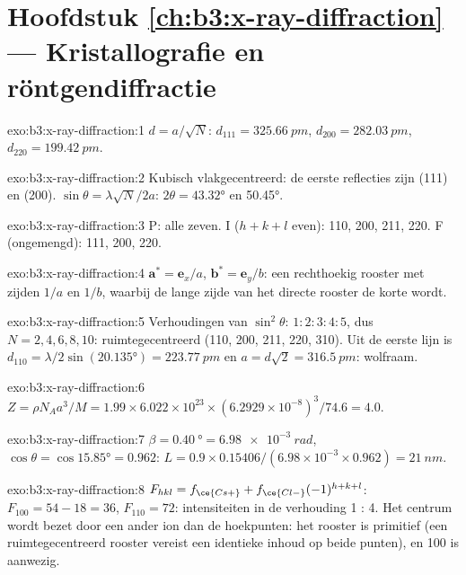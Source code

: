\section*{Hoofdstuk \ref{ch:b3:x-ray-diffraction} --- Kristallografie en röntgendiffractie}

\begin{solution}{exo:b3:x-ray-diffraction:1}
$d = a/\sqrt N$: $d_{111} = \qty{325.66}{pm}$, $d_{200} = \qty{282.03}{pm}$, $d_{220} =
\qty{199.42}{pm}$.
\end{solution}

\begin{solution}{exo:b3:x-ray-diffraction:2}
Kubisch vlakgecentreerd: de eerste reflecties zijn (111) en (200). $\sin\theta = \lambda\sqrt N/2a$: $2\theta =
\ang{43.32}$ en \ang{50.45}.
\end{solution}

\begin{solution}{exo:b3:x-ray-diffraction:3}
P: alle zeven. I ($h + k + l$ even): 110, 200, 211, 220. F (ongemengd): 111, 200, 220.
\end{solution}

\begin{solution}{exo:b3:x-ray-diffraction:4}
$\mathbf a^* = \mathbf e_x/a$, $\mathbf b^* = \mathbf e_y/b$: een rechthoekig
rooster met zijden $1/a$
en $1/b$, waarbij de lange zijde van het directe rooster de korte wordt.
\end{solution}

\begin{solution}{exo:b3:x-ray-diffraction:5}
Verhoudingen van $\sin^2\theta$: $1 : 2 : 3 : 4 : 5$, dus $N = 2, 4, 6, 8, 10$: ruimtegecentreerd (110,
200, 211, 220, 310). Uit de eerste lijn is $d_{110} = \lambda/2\sin(\ang{20.135}) =
\qty{223.77}{pm}$ en $a = d\sqrt2 = \qty{316.5}{pm}$: wolfraam.
\end{solution}

\begin{solution}{exo:b3:x-ray-diffraction:6}
$Z = \rho N_Aa^3/M = 1.99 \times 6.022\times10^{23} \times (6.2929\times10^{-8})^3/74.6 = 4.0$.
\end{solution}

\begin{solution}{exo:b3:x-ray-diffraction:7}
$\beta = \qty{0.40}{\degree} = \qty{6.98e-3}{rad}$, $\cos\theta = \cos\ang{15.85} = 0.962$:
$L = 0.9 \times 0.15406/(6.98\times10^{-3} \times 0.962) = \qty{21}{nm}$.
\end{solution}

\begin{solution}{exo:b3:x-ray-diffraction:8}
$F_{hkl} = f_{\ce{Cs+}} + f_{\ce{Cl-}}(-1)^{h+k+l}$: $F_{100} = 54 - 18 = 36$, $F_{110} = 72$:
intensiteiten in de verhouding 1 : 4. Het centrum wordt bezet door een
ander ion dan de hoekpunten: het rooster is primitief (een
ruimtegecentreerd rooster vereist een identieke inhoud op beide punten), en
100 is aanwezig.
\end{solution}

